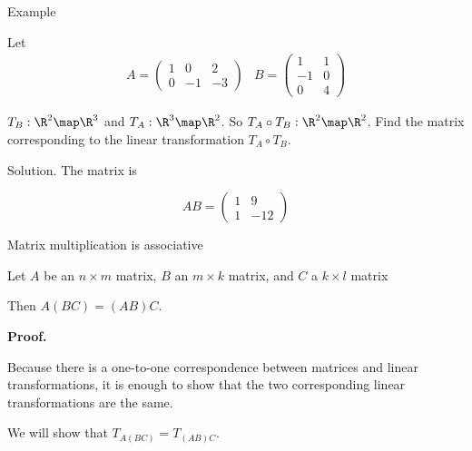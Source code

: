 \documentclass{beamer}
\begin{document}
\begin{frame}{Example}

Let
$$
\begin{matrix}
A=
\begin{pmatrix}
1 &  0 & 2 \\
0 & -1 & -3
\end{pmatrix}
&
B =
\begin{pmatrix}
 1 & 1 \\
-1 & 0 \\
 0 & 4
\end{pmatrix}
\end{matrix}
$$

\pause

$T_B:\R^2\map \R^3$ and $T_A:\R^3\map \R^2$. So $T_A \circ T_B : \R^2\map \R^2$.
Find the matrix corresponding to the linear transformation $T_A \circ T_B$.

\pause

Solution. The matrix is

$$ AB =
\begin{pmatrix}
1 & 9 \\
1 & -12
\end{pmatrix}
$$

\end{frame}


\begin{frame}{Matrix multiplication is associative}

\begin{lemma}
Let $A$ be an $n\times m$ matrix, $B$ an $m\times k$ matrix, and $C$ a $k\times l$ matrix

\pause

Then $A(BC) = (AB)C$.
\end{lemma}

\pause

\textbf{Proof.}

Because there is a one-to-one correspondence between matrices and linear transformations,
it is enough to show that the two corresponding linear transformations are the same.

\pause

\smallskip

We will show that $T_{A(BC)} = T_{(AB)C}$.

\end{frame}

\end{document}
